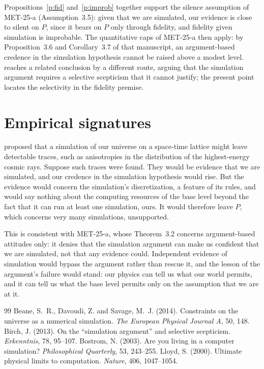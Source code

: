 \documentclass{situationist-preprint}
\begin{document}
Propositions~\ref{p:fid} and~\ref{p:improb} together support the silence assumption of MET-25-a (Assumption~3.5): given that we are simulated, our evidence is close to silent on $P$, since it bears on $P$ only through fidelity, and fidelity given simulation is improbable. The quantitative caps of MET-25-a then apply: by Proposition~3.6 and Corollary~3.7 of that manuscript, an argument-based credence in the simulation hypothesis cannot be raised above a modest level. \citet{Birch2013} reaches a related conclusion by a different route, arguing that the simulation argument requires a selective scepticism that it cannot justify; the present point locates the selectivity in the fidelity premise.

\section{Empirical signatures}

\citet{BeaneDavoudiSavage2014} proposed that a simulation of our universe on a space-time lattice might leave detectable traces, such as anisotropies in the distribution of the highest-energy cosmic rays. Suppose such traces were found. They would be evidence that we are simulated, and our credence in the simulation hypothesis would rise. But the evidence would concern the simulation's discretization, a feature of its rules, and would say nothing about the computing resources of the base level beyond the fact that it can run at least one simulation, ours. It would therefore leave $P$, which concerns very many simulations, unsupported.

This is consistent with MET-25-a, whose Theorem~3.2 concerns argument-based attitudes only: it denies that the simulation argument can make us confident that we are simulated, not that any evidence could. Independent evidence of simulation would bypass the argument rather than rescue it, and the lesson of the argument's failure would stand: our physics can tell us what our world permits, and it can tell us what the base level permits only on the assumption that we are at it.

\begin{thebibliography}{99}\small
{} Beane, S.~R., Davoudi, Z. and Savage, M.~J. (2014). Constraints on the universe as a numerical simulation. \emph{The European Physical Journal A}, 50, 148.
 Birch, J. (2013). On the \enquote{simulation argument} and selective scepticism. \emph{Erkenntnis}, 78, 95--107.
 Bostrom, N. (2003). Are you living in a computer simulation? \emph{Philosophical Quarterly}, 53, 243--255.
 Lloyd, S. (2000). Ultimate physical limits to computation. \emph{Nature}, 406, 1047--1054.
\end{thebibliography}
\end{document}
